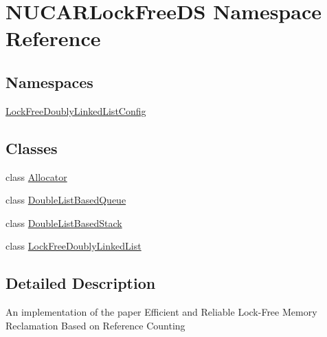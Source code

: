 \hypertarget{namespace_n_u_c_a_r_lock_free_d_s}{}\section{N\+U\+C\+A\+R\+Lock\+Free\+DS Namespace Reference}
\label{namespace_n_u_c_a_r_lock_free_d_s}
\subsection*{Namespaces}
\begin{DoxyCompactItemize}
\item 
 \mbox{\hyperlink{namespace_n_u_c_a_r_lock_free_d_s_1_1_lock_free_doubly_linked_list_config}{Lock\+Free\+Doubly\+Linked\+List\+Config}}
\end{DoxyCompactItemize}
\subsection*{Classes}
\begin{DoxyCompactItemize}
\item 
class \mbox{\hyperlink{class_n_u_c_a_r_lock_free_d_s_1_1_allocator}{Allocator}}
\item 
class \mbox{\hyperlink{class_n_u_c_a_r_lock_free_d_s_1_1_double_list_based_queue}{Double\+List\+Based\+Queue}}
\item 
class \mbox{\hyperlink{class_n_u_c_a_r_lock_free_d_s_1_1_double_list_based_stack}{Double\+List\+Based\+Stack}}
\item 
class \mbox{\hyperlink{class_n_u_c_a_r_lock_free_d_s_1_1_lock_free_doubly_linked_list}{Lock\+Free\+Doubly\+Linked\+List}}
\end{DoxyCompactItemize}


\subsection{Detailed Description}
An implementation of the paper Efficient and Reliable Lock-\/\+Free Memory Reclamation Based on Reference Counting 